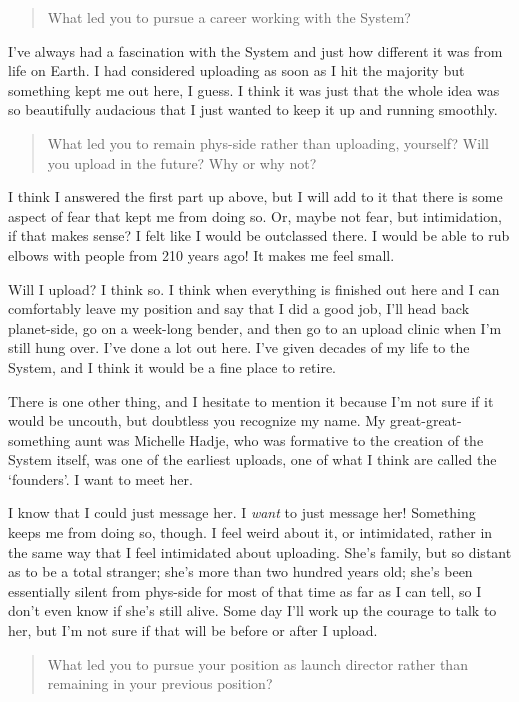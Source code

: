 \begin{quote}
What led you to pursue a career working with the System?
\end{quote}

\noindent I've always had a fascination with the System and just how different it was from life on Earth. I had considered uploading as soon as I hit the majority but something kept me out here, I guess. I think it was just that the whole idea was so beautifully audacious that I just wanted to keep it up and running smoothly.

\begin{quote}
What led you to remain phys-side rather than uploading, yourself? Will you upload in the future? Why or why not?
\end{quote}

\noindent I think I answered the first part up above, but I will add to it that there is some aspect of fear that kept me from doing so. Or, maybe not fear, but intimidation, if that makes sense? I felt like I would be outclassed there. I would be able to rub elbows with people from 210 years ago! It makes me feel small.

Will I upload? I think so. I think when everything is finished out here and I can comfortably leave my position and say that I did a good job, I'll head back planet-side, go on a week-long bender, and then go to an upload clinic when I'm still hung over. I've done a lot out here. I've given decades of my life to the System, and I think it would be a fine place to retire.

There is one other thing, and I hesitate to mention it because I'm not sure if it would be uncouth, but doubtless you recognize my name. My great-great-something aunt was Michelle Hadje, who was formative to the creation of the System itself, was one of the earliest uploads, one of what I think are called the `founders'. I want to meet her.

I know that I could just message her. I \emph{want} to just message her! Something keeps me from doing so, though. I feel weird about it, or intimidated, rather in the same way that I feel intimidated about uploading. She's family, but so distant as to be a total stranger; she's more than two hundred years old; she's been essentially silent from phys-side for most of that time as far as I can tell, so I don't even know if she's still alive. Some day I'll work up the courage to talk to her, but I'm not sure if that will be before or after I upload.

\vspace{-6pt}
\begin{quote}
What led you to pursue your position as launch director rather than remaining in your previous position?
\end{quote}

